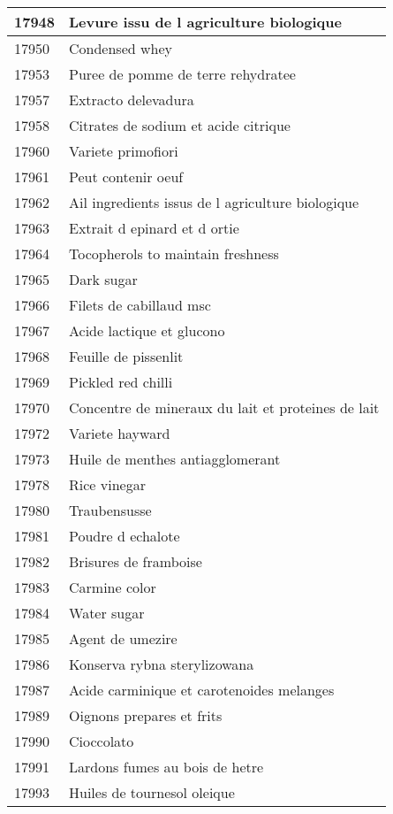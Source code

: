 \begin{longtable}{|l|l|}
17948 & Levure  issu de l agriculture biologique \\ \hline 
17950 & Condensed whey \\ \hline 
17953 & Puree de pomme de terre rehydratee \\ \hline 
17957 & Extracto delevadura \\ \hline 
17958 & Citrates de sodium et acide citrique \\ \hline 
17960 & Variete primofiori \\ \hline 
17961 & Peut contenir oeuf \\ \hline 
17962 & Ail  ingredients issus de l agriculture biologique \\ \hline 
17963 & Extrait d epinard et d ortie \\ \hline 
17964 & Tocopherols to maintain freshness \\ \hline 
17965 & Dark sugar \\ \hline 
17966 & Filets de cabillaud msc \\ \hline 
17967 & Acide lactique et glucono \\ \hline 
17968 & Feuille de pissenlit \\ \hline 
17969 & Pickled red chilli \\ \hline 
17970 & Concentre de mineraux du lait et proteines de lait \\ \hline 
17972 & Variete hayward \\ \hline 
17973 & Huile de menthes antiagglomerant \\ \hline 
17978 & Rice vinegar \\ \hline 
17980 & Traubensusse \\ \hline 
17981 & Poudre d echalote \\ \hline 
17982 & Brisures de framboise \\ \hline 
17983 & Carmine color \\ \hline 
17984 & Water sugar \\ \hline 
17985 & Agent de umezire \\ \hline 
17986 & Konserva rybna sterylizowana \\ \hline 
17987 & Acide carminique et carotenoides melanges \\ \hline 
17989 & Oignons prepares et frits \\ \hline 
17990 & Cioccolato \\ \hline 
17991 & Lardons fumes au bois de hetre \\ \hline 
17993 & Huiles de tournesol oleique \\ \hline 

\end{longtable}

